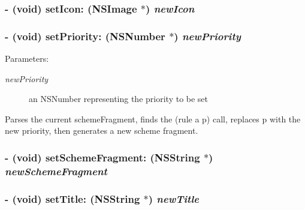\hypertarget{interface_c_m_rule_ad8e35c1a1a8d51196b404ac777ba605}{
\subsubsection[setIcon:]{\setlength{\rightskip}{0pt plus 5cm}- (void) setIcon: (NSImage $\ast$) {\em newIcon}}}
\label{interface_c_m_rule_ad8e35c1a1a8d51196b404ac777ba605}


\hypertarget{interface_c_m_rule_2b25aeb05541e065609bb4f9b2753563}{
\subsubsection[setPriority:]{\setlength{\rightskip}{0pt plus 5cm}- (void) setPriority: (NSNumber $\ast$) {\em newPriority}}}
\label{interface_c_m_rule_2b25aeb05541e065609bb4f9b2753563}


\begin{Desc}
\item[Parameters:]
\begin{description}
\item[{\em newPriority}]an NSNumber representing the priority to be set\end{description}
\end{Desc}
Parses the current schemeFragment, finds the (rule a p) call, replaces p with the new priority, then generates a new scheme fragment. \hypertarget{interface_c_m_rule_423429401c268d2591fd138ca03bf494}{
\subsubsection[setSchemeFragment:]{\setlength{\rightskip}{0pt plus 5cm}- (void) setSchemeFragment: ({\bf NSString} $\ast$) {\em newSchemeFragment}}}
\label{interface_c_m_rule_423429401c268d2591fd138ca03bf494}


\hypertarget{interface_c_m_rule_72255be9d9d50884e692835f461d906e}{
\subsubsection[setTitle:]{\setlength{\rightskip}{0pt plus 5cm}- (void) setTitle: ({\bf NSString} $\ast$) {\em newTitle}}}
\label{interface_c_m_rule_72255be9d9d50884e692835f461d906e}


